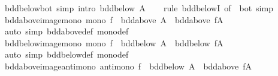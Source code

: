 \begin{isabellebody}
\isamarkupfalse%
\ bdd{\isacharunderscore}{\kern0pt}below{\isacharunderscore}{\kern0pt}bot\ {\isacharbrackleft}{\kern0pt}simp{\isacharcomma}{\kern0pt}\ intro{\isacharbang}{\kern0pt}{\isacharbrackright}{\kern0pt}{\isacharcolon}{\kern0pt}\ {\isachardoublequoteopen}bdd{\isacharunderscore}{\kern0pt}below\ A{\isachardoublequoteclose}\isanewline
%
\isadelimproof
\ \ %
\endisadelimproof
%
\isatagproof
{}\isamarkupfalse%
\ {\isacharparenleft}{\kern0pt}rule\ bdd{\isacharunderscore}{\kern0pt}belowI\ {\isacharbrackleft}{\kern0pt}of\ {\isacharunderscore}{\kern0pt}\ bot{\isacharbrackright}{\kern0pt}{\isacharparenright}{\kern0pt}\ simp%
\endisatagproof
{\isafoldproof}%
%
\isadelimproof
\isanewline
%
\endisadelimproof
\isanewline
{}\isamarkupfalse%
\isanewline
\isanewline
{}\isamarkupfalse%
\ bdd{\isacharunderscore}{\kern0pt}above{\isacharunderscore}{\kern0pt}image{\isacharunderscore}{\kern0pt}mono{\isacharcolon}{\kern0pt}\ {\isachardoublequoteopen}mono\ f\ {\isasymLongrightarrow}\ bdd{\isacharunderscore}{\kern0pt}above\ A\ {\isasymLongrightarrow}\ bdd{\isacharunderscore}{\kern0pt}above\ {\isacharparenleft}{\kern0pt}f{\isacharbackquote}{\kern0pt}A{\isacharparenright}{\kern0pt}{\isachardoublequoteclose}\isanewline
%
\isadelimproof
\ \ %
\endisadelimproof
%
\isatagproof
{}\isamarkupfalse%
\ {\isacharparenleft}{\kern0pt}auto\ simp{\isacharcolon}{\kern0pt}\ bdd{\isacharunderscore}{\kern0pt}above{\isacharunderscore}{\kern0pt}def\ mono{\isacharunderscore}{\kern0pt}def{\isacharparenright}{\kern0pt}%
\endisatagproof
{\isafoldproof}%
%
\isadelimproof
\isanewline
%
\endisadelimproof
\isanewline
{}\isamarkupfalse%
\ bdd{\isacharunderscore}{\kern0pt}below{\isacharunderscore}{\kern0pt}image{\isacharunderscore}{\kern0pt}mono{\isacharcolon}{\kern0pt}\ {\isachardoublequoteopen}mono\ f\ {\isasymLongrightarrow}\ bdd{\isacharunderscore}{\kern0pt}below\ A\ {\isasymLongrightarrow}\ bdd{\isacharunderscore}{\kern0pt}below\ {\isacharparenleft}{\kern0pt}f{\isacharbackquote}{\kern0pt}A{\isacharparenright}{\kern0pt}{\isachardoublequoteclose}\isanewline
%
\isadelimproof
\ \ %
\endisadelimproof
%
\isatagproof
{}\isamarkupfalse%
\ {\isacharparenleft}{\kern0pt}auto\ simp{\isacharcolon}{\kern0pt}\ bdd{\isacharunderscore}{\kern0pt}below{\isacharunderscore}{\kern0pt}def\ mono{\isacharunderscore}{\kern0pt}def{\isacharparenright}{\kern0pt}%
\endisatagproof
{\isafoldproof}%
%
\isadelimproof
\isanewline
%
\endisadelimproof
\isanewline
{}\isamarkupfalse%
\ bdd{\isacharunderscore}{\kern0pt}above{\isacharunderscore}{\kern0pt}image{\isacharunderscore}{\kern0pt}antimono{\isacharcolon}{\kern0pt}\ {\isachardoublequoteopen}antimono\ f\ {\isasymLongrightarrow}\ bdd{\isacharunderscore}{\kern0pt}below\ A\ {\isasymLongrightarrow}\ bdd{\isacharunderscore}{\kern0pt}above\ {\isacharparenleft}{\kern0pt}f{\isacharbackquote}{\kern0pt}A{\isacharparenright}{\kern0pt}{\isachardoublequoteclose}\isanewline

\end{isabellebody}
